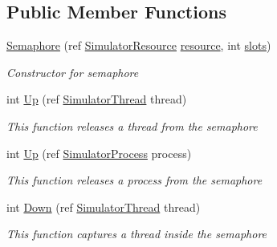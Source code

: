 \subsection*{Public Member Functions}
\begin{DoxyCompactItemize}
\item 
\hyperlink{class_c_p_u___o_s___simulator_1_1_operating___system_1_1_threading_1_1_semaphore_a0b4125f7ad910b112ba70c0f2110967e}{Semaphore} (ref \hyperlink{class_c_p_u___o_s___simulator_1_1_operating___system_1_1_simulator_resource}{Simulator\+Resource} \hyperlink{class_c_p_u___o_s___simulator_1_1_operating___system_1_1_threading_1_1_semaphore_a9e455411df1e6ee61e1479f63767771c}{resource}, int \hyperlink{class_c_p_u___o_s___simulator_1_1_operating___system_1_1_threading_1_1_semaphore_af038c196aad3640c1342b6cd5e67c758}{slots})
\begin{DoxyCompactList}\small\item\em Constructor for semaphore \end{DoxyCompactList}\item 
int \hyperlink{class_c_p_u___o_s___simulator_1_1_operating___system_1_1_threading_1_1_semaphore_a14fc9e99e29d84637eea9bf880b269d3}{Up} (ref \hyperlink{class_c_p_u___o_s___simulator_1_1_operating___system_1_1_threading_1_1_simulator_thread}{Simulator\+Thread} thread)
\begin{DoxyCompactList}\small\item\em This function releases a thread from the semaphore \end{DoxyCompactList}\item 
int \hyperlink{class_c_p_u___o_s___simulator_1_1_operating___system_1_1_threading_1_1_semaphore_af4692bedba8598ad15a35127731ff752}{Up} (ref \hyperlink{class_c_p_u___o_s___simulator_1_1_operating___system_1_1_simulator_process}{Simulator\+Process} process)
\begin{DoxyCompactList}\small\item\em This function releases a process from the semaphore \end{DoxyCompactList}\item 
int \hyperlink{class_c_p_u___o_s___simulator_1_1_operating___system_1_1_threading_1_1_semaphore_af675ae6bbd057311e8fb4a36404b8d82}{Down} (ref \hyperlink{class_c_p_u___o_s___simulator_1_1_operating___system_1_1_threading_1_1_simulator_thread}{Simulator\+Thread} thread)
\begin{DoxyCompactList}\small\item\em This function captures a thread inside the semaphore \end{DoxyCompactList}\item 

\end{DoxyCompactItemize}
